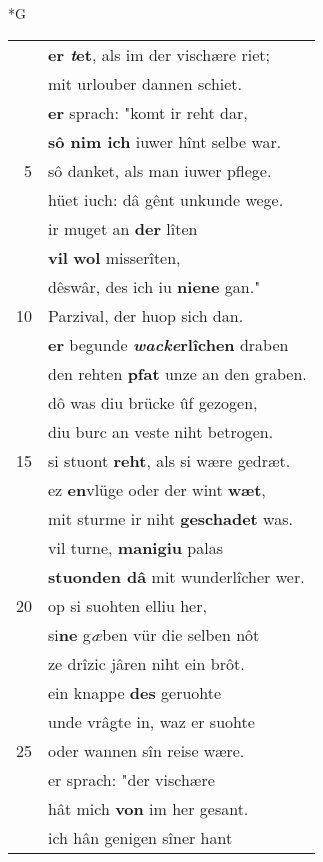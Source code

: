 \documentclass[8pt,a4paper,notitlepage]{article}
\begin{document}
\newpage
\begin{table}[ht]
\begin{minipage}[t]{0.5\linewidth}
\small
\begin{center}*G
\end{center}
\begin{tabular}{rl}
 & \textbf{er \textit{t}et}, als im der vischære riet;\\ 
 & mit urlouber dannen schiet.\\ 
 & \textbf{er} sprach: "komt ir reht dar,\\ 
 & \textbf{sô nim ich} iuwer hînt selbe war.\\ 
5 & sô danket, als man iuwer pflege.\\ 
 & hüet iuch: dâ gênt unkunde wege.\\ 
 & ir muget an \textbf{der} lîten\\ 
 & \textbf{vil} \textbf{wol} misserîten,\\ 
 & dêswâr, des ich iu \textbf{niene} gan."\\ 
10 & Parzival, der huop sich dan.\\ 
 & \textbf{er} begunde \textbf{\textit{wacke}rlîchen} draben\\ 
 & den rehten \textbf{pfat} unze an den graben.\\ 
 & dô was diu brücke ûf gezogen,\\ 
 & diu burc an veste niht betrogen.\\ 
15 & si stuont \textbf{reht}, als si wære gedræt.\\ 
 & ez \textbf{en}vlüge oder der wint \textbf{wæt},\\ 
 & mit sturme ir niht \textbf{geschadet} was.\\ 
 & vil turne, \textbf{manigiu} palas\\ 
 & \textbf{stuonden dâ} mit wunderlîcher wer.\\ 
20 & op si suohten elliu her,\\ 
 & si\textbf{ne} g\textit{æ}ben vür die selben nôt\\ 
 & ze drîzic jâren niht ein brôt.\\ 
 & ein knappe \textbf{des} geruohte\\ 
 & unde vrâgte in, waz er suohte\\ 
25 & oder wannen sîn reise wære.\\ 
 & er sprach: "der vischære\\ 
 & hât mich \textbf{von} im her gesant.\\ 
 & ich hân genigen sîner hant\\ 

\end{tabular}
\end{minipage}
\end{table}
\end{document}
